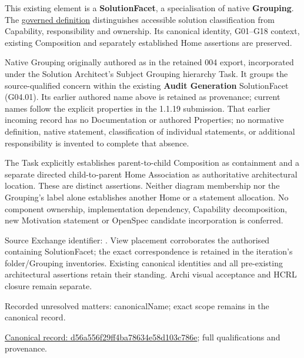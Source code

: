 This existing element is a \textbf{SolutionFacet}, a specialisation of native
\textbf{Grouping}. The \href{\detokenize{../../../../../../../governance/continuum-representation.md#solutionfacet-classification--1119-candidate}}{governed definition}
distinguishes accessible solution classification from Capability, responsibility
and ownership. Its canonical identity, G01–G18 context, existing Composition
and separately established Home assertions are preserved.



Native Grouping originally authored as \texttt{} in the retained 004 export,
incorporated under the Solution Architect's Subject Grouping hierarchy Task.
It groups the source-qualified \texttt{} concern within
the existing \textbf{Audit Generation} SolutionFacet (G04.01). Its earlier authored name above is retained as provenance; current names
follow the explicit properties in the 1.1.19 submission.
That earlier incoming record has no Documentation or authored Properties; no normative
definition, native statement, classification of individual statements, or
additional responsibility is invented to complete that absence.



The Task explicitly establishes parent-to-child Composition as containment and
a separate directed child-to-parent Home Association as authoritative architectural
location. These are distinct assertions. Neither diagram membership nor the
Grouping's label alone establishes another Home or a statement allocation.
No component ownership, implementation dependency, Capability decomposition,
new Motivation statement or OpenSpec candidate incorporation is conferred.



Source Exchange identifier: \texttt{}. View placement corroborates
the authorised containing SolutionFacet; the exact correspondence is retained in the
iteration's folder/Grouping inventories. Existing canonical identities and all
pre-existing architectural assertions retain their standing. Archi visual
acceptance and HCRL closure remain separate.


{\small Recorded unresolved matters: canonicalName; exact scope remains in the canonical record.}\par
{\footnotesize \href{../../../../../../../continuum/grouping/d56a556f29ff4ba78634e58d103c786e.md}{Canonical record: d56a556f29ff4ba78634e58d103c786e}; full qualifications and provenance.}\par
